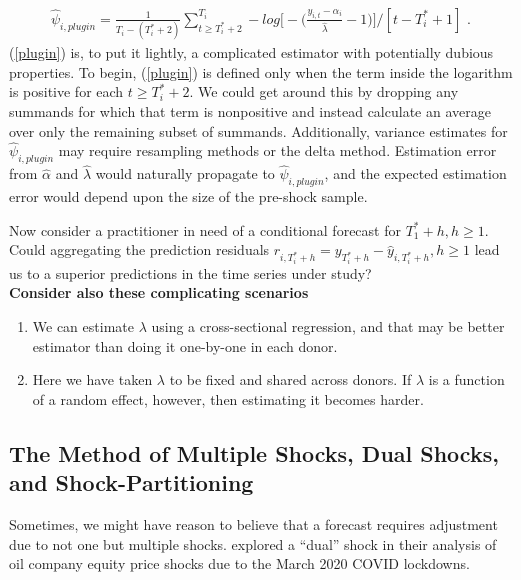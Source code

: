 \documentclass[11pt]{article}
\theoremstyle{definition}
\begin{document}
\begin{align}
\hat\psi_{i,plugin} = \frac{1}{T_{i}-(T_{i}^{*}+2)}\sum^{T_{i}}_{t\geq T_{i}^{*}+2}-log{\big[-\big(\frac{y_{i,t}-\hat\alpha_{i}}{\hat\lambda} -1\big)\big]} / [t-T_{i}^{*}+1]\text{ .}\label{plugin}
\end{align}
(\ref{plugin}) is, to put it lightly, a complicated estimator with potentially dubious properties.  To begin, (\ref{plugin}) is defined only when the term inside the logarithm is positive for each $t\geq T^{*}_{i}+2$.  We could get around this by dropping any summands for which that term is nonpositive and instead calculate an average over only the remaining subset of summands.  Additionally, variance estimates for $\hat\psi_{i,plugin}$ may require resampling methods or the delta method.  Estimation error from $\hat\alpha$ and $\hat\lambda$ would naturally propagate to $\hat\psi_{i,plugin}$, and the expected estimation error would depend upon the size of the pre-shock sample.

Now consider a practitioner in need of a conditional forecast for $T_{1}^{*}+h, h\geq 1$.  Could aggregating the prediction residuals $r_{i,T_{i}^{*}+h} = y_{T_{i}^{*}+h}-\hat y_{i, T_{i}^{*}+h}, h\geq 1$ lead us to a superior predictions in the time series under study?\\

\textbf{Consider also these complicating scenarios}
\begin{enumerate}
  \item We can estimate $\lambda$ using a cross-sectional regression, and that may be better estimator than doing it one-by-one in each donor.
  \item Here we have taken $\lambda$ to be fixed and shared across donors.  If $\lambda$ is a function of a random effect, however, then estimating it becomes harder.
\end{enumerate}

\subsection{The Method of Multiple Shocks, Dual Shocks, and Shock-Partitioning}

Sometimes, we might have reason to believe that a forecast requires adjustment due to not one but multiple shocks.  \cite{lin2021minimizing} explored a ``dual'' shock in their analysis of oil company equity price shocks due to the March 2020 COVID lockdowns.  \\
\end{document}
